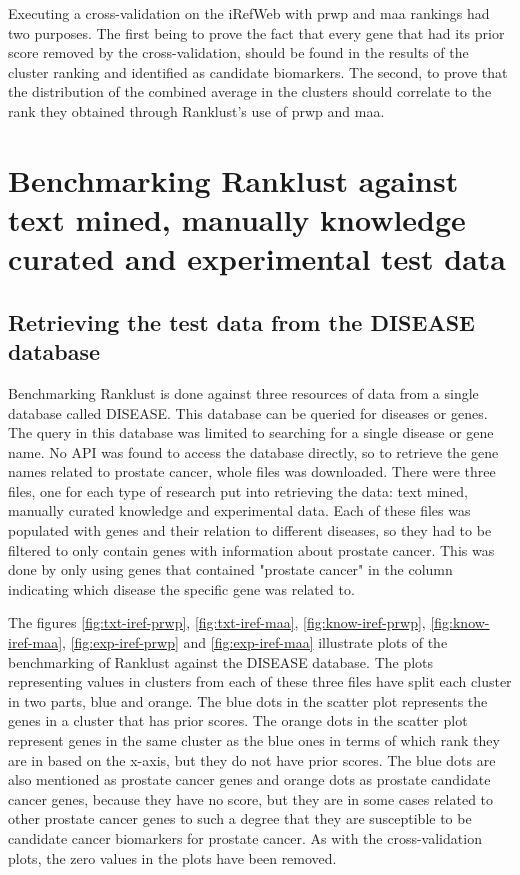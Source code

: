 Executing a cross-validation on the iRefWeb with \gls{prwp} and \gls{maa}
rankings had two purposes. The first being to prove the fact that every gene
that had its prior score removed by the cross-validation, should be found in the
results of the cluster ranking and identified as candidate biomarkers. The
second, to prove that the distribution of the combined average in the clusters
should correlate to the rank they obtained through Ranklust's use of \gls{prwp}
and \gls{maa}.

\chapter{Benchmarking Ranklust against text mined, manually knowledge curated and experimental test data}
\section{Retrieving the test data from the DISEASE database}
Benchmarking Ranklust is done against three resources of data from a single
database called DISEASE\cite{jensen}. This database can be queried for diseases
or genes. The query in this database was limited to searching for a single
disease or gene name. No API was found to access the database directly, so to
retrieve the gene names related to prostate cancer, whole files was downloaded.
There were three files, one for each type of research put into retrieving the
data: text mined, manually curated knowledge and experimental data. Each of
these files was populated with genes and their relation to different diseases, so
they had to be filtered to only contain genes with information about prostate
cancer. This was done by only using genes that contained "prostate cancer" in
the column indicating which disease the specific gene was related to.

The figures \ref{fig:txt-iref-prwp}, \ref{fig:txt-iref-maa},
\ref{fig:know-iref-prwp}, \ref{fig:know-iref-maa}, \ref{fig:exp-iref-prwp} and
\ref{fig:exp-iref-maa} illustrate plots of the benchmarking of Ranklust against
the DISEASE database. The plots representing values in clusters from each of
these three files have split each cluster in two parts, blue and orange. The
blue dots in the scatter plot represents the genes in a cluster that has prior
scores. The orange dots in the scatter plot represent genes in the same cluster
as the blue ones in terms of which rank they are in based on the x-axis, but
they do not have prior scores. The blue dots are also mentioned as prostate
cancer genes and orange dots as prostate candidate cancer genes, because they
have no score, but they are in some cases related to other prostate cancer genes
to such a degree that they are susceptible to be candidate cancer biomarkers for
prostate cancer. As with the cross-validation plots, the zero
values in the plots have been removed.


